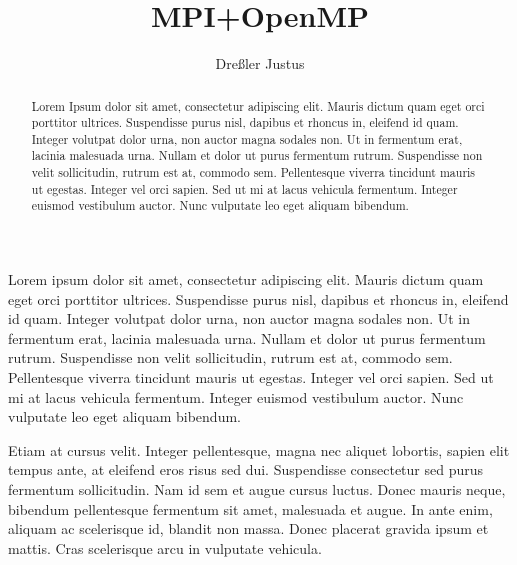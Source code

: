 \documentclass[sigconf]{acmart} %
\begin{document}
\title{MPI+OpenMP} %
\author{Dreßler Justus}



\begin{abstract}

    Lorem Ipsum dolor sit amet, consectetur adipiscing elit.
    Mauris dictum quam eget orci porttitor ultrices.
    Suspendisse purus nisl, dapibus et rhoncus in, eleifend id quam. Integer volutpat dolor urna, non auctor magna sodales non.
    Ut in fermentum erat, lacinia malesuada urna.
    Nullam et dolor ut purus fermentum rutrum.
    Suspendisse non velit sollicitudin, rutrum est at, commodo sem. Pellentesque viverra tincidunt mauris ut egestas.
    Integer vel orci sapien. Sed ut mi at lacus vehicula fermentum.
    Integer euismod vestibulum auctor.
    Nunc vulputate leo eget aliquam bibendum.

\end{abstract}

\maketitle




Lorem ipsum dolor sit amet, consectetur adipiscing elit. Mauris dictum quam eget orci porttitor ultrices. Suspendisse purus nisl, dapibus et rhoncus in, eleifend id quam. Integer volutpat dolor urna, non auctor magna sodales non. Ut in fermentum erat, lacinia malesuada urna. Nullam et dolor ut purus fermentum rutrum. Suspendisse non velit sollicitudin, rutrum est at, commodo sem. Pellentesque viverra tincidunt mauris ut egestas. Integer vel orci sapien. Sed ut mi at lacus vehicula fermentum. Integer euismod vestibulum auctor. Nunc vulputate leo eget aliquam bibendum.

Etiam at cursus velit. Integer pellentesque, magna nec aliquet lobortis, sapien elit tempus ante, at eleifend eros risus sed dui. Suspendisse consectetur sed purus fermentum sollicitudin. Nam id sem et augue cursus luctus. Donec mauris neque, bibendum pellentesque fermentum sit amet, malesuada et augue. In ante enim, aliquam ac scelerisque id, blandit non massa. Donec placerat gravida ipsum et mattis. Cras scelerisque arcu in vulputate vehicula.
\end{document}
